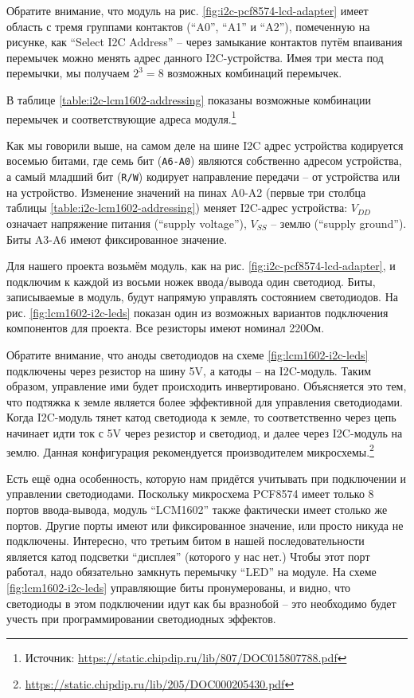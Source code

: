 \documentclass[../sparc.tex]{subfiles}
\begin{document}
Обратите внимание, что модуль на рис. \ref{fig:i2c-pcf8574-lcd-adapter} имеет
область с тремя группами контактов (``A0'', ``A1'' и ``A2''), помеченную на
рисунке, как ``Select I2C Address'' -- через замыкание контактов путём впаивания
перемычек можно менять адрес данного I2C-устройства.  Имея три места под
перемычки, мы получаем $2^3 = 8$ возможных комбинаций перемычек.


В таблице \ref{table:i2c-lcm1602-addressing} показаны возможные комбинации
перемычек и соответствующие адреса модуля.\footnote{Источник:
\url{https://static.chipdip.ru/lib/807/DOC015807788.pdf}}

Как мы говорили выше, на самом деле на шине I2C адрес устройства кодируется
восемью битами, где семь бит (\texttt{A6-A0}) являются собственно адресом
устройства, а самый младший бит (\texttt{R/W}) кодирует направление передачи --
от устройства или на устройство.  Изменение значений на пинах A0-A2 (первые три
столбца таблицы \ref{table:i2c-lcm1602-addressing}) меняет I2C-адрес устройства:
$V_{DD}$ означает напряжение питания (``supply voltage''), $V_{SS}$ -- землю
(``supply ground'').  Биты A3-A6 имеют фиксированное значение.


Для нашего проекта возьмём модуль, как на рис.
\ref{fig:i2c-pcf8574-lcd-adapter}, и подключим к каждой из восьми ножек
ввода/вывода один светодиод.  Биты, записываемые в модуль, будут напрямую
управлять состоянием светодиодов.  На рис. \ref{fig:lcm1602-i2c-leds} показан
один из возможных вариантов подключения компонентов для проекта.  Все резисторы
имеют номинал 220Ом.

Обратите внимание, что аноды светодиодов на схеме \ref{fig:lcm1602-i2c-leds}
подключены через резистор на шину 5V, а катоды -- на I2C-модуль.  Таким образом,
управление ими будет происходить инвертировано.  Объясняется это тем, что
подтяжка к земле является более эффективной для управления светодиодами.  Когда
I2C-модуль тянет катод светодиода к земле, то соответственно через цепь начинает
идти ток с 5V через резистор и светодиод, и далее через I2C-модуль на землю.
Данная конфигурация рекомендуется производителем
микросхемы.\footnote{\url{https://static.chipdip.ru/lib/205/DOC000205430.pdf}}

Есть ещё одна особенность, которую нам придётся учитывать при подключении и
управлении светодиодами.  Поскольку микросхема PCF8574 имеет только 8 портов
ввода-вывода, модуль ``LCM1602'' также фактически имеет столько же портов.
Другие порты имеют или фиксированное значение, или просто никуда не подключены.
Интересно, что третьим битом в нашей последовательности является катод подсветки
``дисплея'' (которого у нас нет.)  Чтобы этот порт работал, надо обязательно
замкнуть перемычку ``LED'' на модуле.  На схеме \ref{fig:lcm1602-i2c-leds}
управляющие биты пронумерованы, и видно, что светодиоды в этом подключении идут
как бы вразнобой -- это необходимо будет учесть при программировании светодиодных
эффектов.
\end{document}
